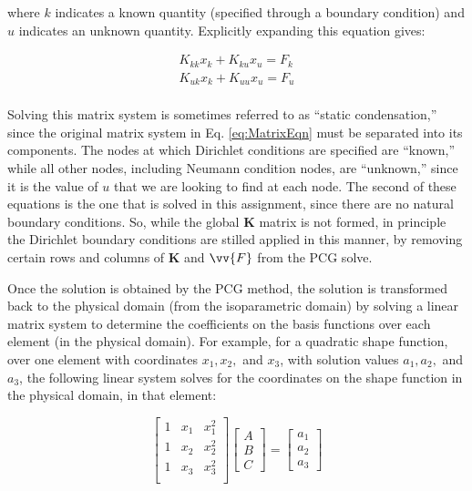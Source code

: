 \documentclass[10pt]{article}
\begin{document}
where \(k\) indicates a known quantity (specified through a boundary condition) and \(u\) indicates an unknown quantity.   Explicitly expanding this equation gives:

\begin{equation}
\begin{aligned}
K_{kk}x_k+K_{ku}x_u=F_k\\
K_{uk}x_k+K_{uu}x_u=F_u\\
\end{aligned}
\end{equation}

Solving this matrix system is sometimes referred to as ``static condensation,'' since the original matrix system in Eq. \eqref{eq:MatrixEqn} must be separated into its components. The nodes at which Dirichlet conditions are specified are ``known,'' while all other nodes, including Neumann condition nodes, are ``unknown,'' since it is the value of \(u\) that we are looking to find at each node. The second of these equations is the one that is solved in this assignment, since there are no natural boundary conditions. So, while the global \textbf{K} matrix is not formed, in principle the Dirichlet boundary conditions are stilled applied in this manner, by removing certain rows and columns of \textbf{K} and \(\vv{F}\) from the PCG solve.

Once the solution is obtained by the PCG method, the solution is transformed back to the physical domain (from the isoparametric domain) by solving a linear matrix system to determine the coefficients on the basis functions over each element (in the physical domain). For example, for a quadratic shape function, over one element with coordinates \(x_1, x_2,\) and \(x_3\), with solution values \(a_1, a_2,\) and \(a_3\), the following linear system solves for the coordinates on the shape function in the physical domain, in that element:

\begin{equation}
\label{eq:LinearSolve}
\begin{bmatrix}
1 & x_1 & x_1^2\\
1 & x_2 & x_2^2\\
1 & x_3 & x_3^2\\
\end{bmatrix}
\begin{bmatrix} A\\ B\\ C
\end{bmatrix}
=
\begin{bmatrix} a_1 \\ a_2 \\ a_3
\end{bmatrix}
\end{equation}
\end{document}
